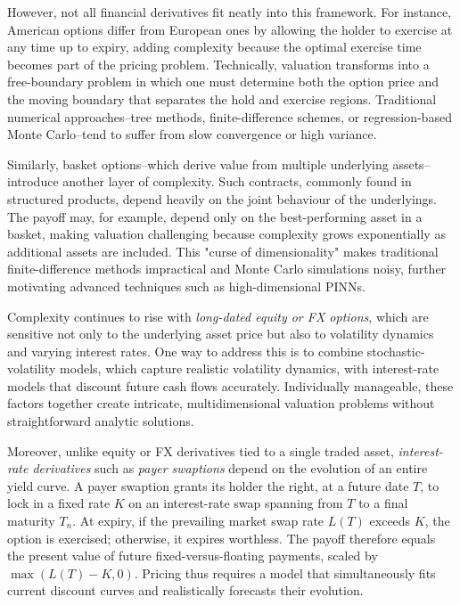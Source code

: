 \documentclass[12pt]{report} %
\theoremstyle{plain}           %
\theoremstyle{definition}      %
\theoremstyle{remark}          %
\begin{document}
However, not all financial derivatives fit neatly into this framework. For instance, American
options differ from European ones by allowing the holder to exercise at any time up to expiry,
adding complexity because the optimal exercise time becomes part of the pricing problem.
Technically, valuation transforms into a free-boundary problem in which one must determine both the
option price and the moving boundary that separates the hold and exercise regions. Traditional
numerical approaches--tree methods, finite-difference schemes, or regression-based Monte
Carlo--tend to suffer from slow convergence or high variance.

Similarly, basket options--which derive value from multiple underlying assets--introduce another
layer of complexity. Such contracts, commonly found in structured products, depend heavily on the
joint behaviour of the underlyings. The payoff may, for example, depend only on the
best-performing asset in a basket, making valuation challenging because complexity grows
exponentially as additional assets are included. This "curse of dimensionality" makes traditional
finite-difference methods impractical and Monte Carlo simulations noisy, further motivating
advanced techniques such as high-dimensional PINNs.

Complexity continues to rise with \emph{long-dated equity or FX options}, which are sensitive not
only to the underlying asset price but also to volatility dynamics and varying interest rates. One
way to address this is to combine stochastic-volatility models, which capture realistic volatility
dynamics, with interest-rate models that discount future cash flows accurately. Individually
manageable, these factors together create intricate, multidimensional valuation problems without
straightforward analytic solutions.

Moreover, unlike equity or FX derivatives tied to a single traded asset, \emph{interest-rate
derivatives} such as \emph{payer swaptions} depend on the evolution of an entire yield curve. A
payer swaption grants its holder the right, at a future date \(T\), to lock in a fixed rate \(K\)
on an interest-rate swap spanning from \(T\) to a final maturity \(T_n\). At expiry, if the
prevailing market swap rate \(L(T)\) exceeds \(K\), the option is exercised; otherwise, it expires
worthless. The payoff therefore equals the present value of future fixed-versus-floating payments,
scaled by \(\max(L(T)-K,0)\). Pricing thus requires a model that simultaneously fits current
discount curves and realistically forecasts their evolution.
\end{document}
